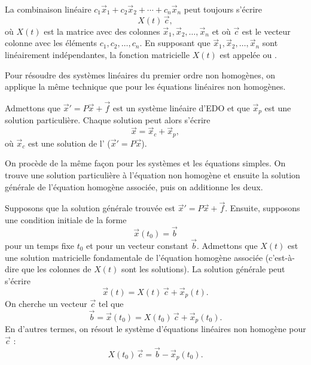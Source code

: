 La combinaison linéaire $c_1 \vec{x}_1 + c_2 \vec{x}_2 + \cdots + c_n
\vec{x}_n$ peut toujours s'écrire
\begin{equation*}
X(t)\,\vec{c} ,
\end{equation*}
où $X(t)$ est la matrice avec des colonnes $\vec{x}_1, \vec{x}_2, \ldots, \vec{x}_n$
et où $\vec{c}$ est le vecteur colonne avec les éléments $c_1, c_2, \ldots, c_n$.
En supposant que $\vec{x}_1,\vec{x}_2,\ldots,\vec{x}_n$ sont linéairement indépendantes, la fonction matricielle $X(t)$ est appelée \emph{}
ou \emph{}.

\medskip

Pour résoudre des systèmes linéaires du premier ordre non homogènes, on applique la même technique que pour les équations linéaires non homogènes.

\begin{theorem}
Admettons que
${\vec{x}}' = P\vec{x} + \vec{f}$ est un système linéaire d'EDO et que $\vec{x}_p$ est une solution particulière. Chaque solution peut alors s'écrire
\begin{equation*}
\vec{x} = \vec{x}_c + \vec{x}_p ,
\end{equation*}
où $\vec{x}_c$ est une solution de l'
(${\vec{x}}' = P\vec{x}$).
\end{theorem}

On procède de la même façon pour les systèmes et les équations simples. On trouve une solution particulière à l'équation non homogène et ensuite la solution générale de l'équation homogène associée, puis on additionne les deux.

\medskip

Supposons que la solution générale trouvée est
${\vec{x}}' = P\vec{x} + \vec{f}$. Ensuite, supposons une condition initiale de la forme
\begin{equation*}
\vec{x}(t_0) = \vec{b}
\end{equation*}
pour un temps fixe $t_0$ et pour un vecteur constant $\vec{b}$. Admettons que $X(t)$ est une solution matricielle fondamentale de l'équation homogène associée (c'est-à-dire que les colonnes de $X(t)$ sont les solutions). La solution générale peut s'écrire
\begin{equation*}
\vec{x}(t) = X(t)\,\vec{c} + \vec{x}_p(t).
\end{equation*}
On cherche un vecteur 
$\vec{c}$ tel que
\begin{equation*}
\vec{b} = \vec{x}(t_0) = X(t_0)\,\vec{c} + \vec{x}_p(t_0).
\end{equation*}
En d'autres termes, on résout le système d'équations linéaires non homogène pour $\vec{c}$ :
\begin{equation*}
X(t_0)\,\vec{c} = \vec{b} - \vec{x}_p(t_0) .
\end{equation*}

